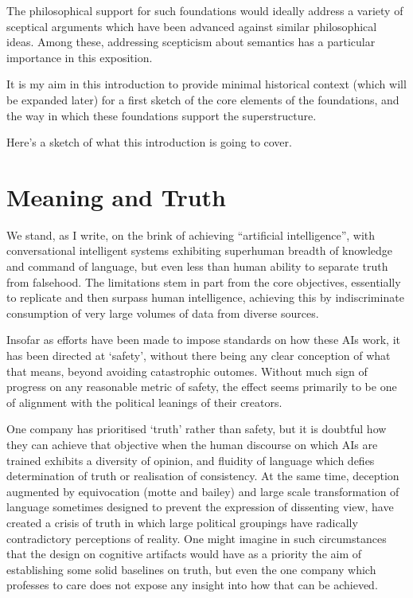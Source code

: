 \documentclass[10pt,titlepage]{book}
\begin{document}
The philosophical support for such foundations would ideally address a variety of sceptical arguments which have been advanced against similar philosophical ideas.
Among these, addressing scepticism about semantics has a particular importance in this exposition.

It is my aim in this introduction to provide minimal historical context (which will be expanded later) for a first sketch of the core elements of the foundations, and the way in which these foundations support the superstructure.





Here's a sketch of what this introduction is going to cover.

\section{Meaning and Truth}

We stand, as I write, on the brink of achieving ``artificial intelligence'', with conversational intelligent systems exhibiting superhuman breadth of knowledge and command of language, but even less than human ability to separate truth from falsehood.
The limitations stem in part from the core objectives, essentially to replicate and then surpass human intelligence, achieving this by indiscriminate consumption of very large volumes of data from diverse sources.

Insofar as efforts have been made to impose standards on how these AIs work, it has been directed at `safety', without there being any clear conception of what that means, beyond avoiding catastrophic outomes.
Without much sign of progress on any reasonable metric of safety, the effect seems primarily to be one of alignment with the political leanings of their creators.

One company has prioritised `truth' rather than safety, but it is doubtful how they can achieve that objective when the human discourse on which AIs are trained exhibits a diversity of opinion, and fluidity of language which defies determination of truth or realisation of consistency.
At the same time, deception augmented by equivocation (motte and bailey) and large scale transformation of language sometimes designed to prevent the expression of dissenting view, have created a crisis of truth in which large political groupings have radically  contradictory perceptions of reality.
One might imagine in such circumstances that the design on cognitive artifacts would have as a priority the aim of establishing some solid baselines on truth, but even the one company which professes to care does not expose any insight into how that can be achieved.
\end{document}

